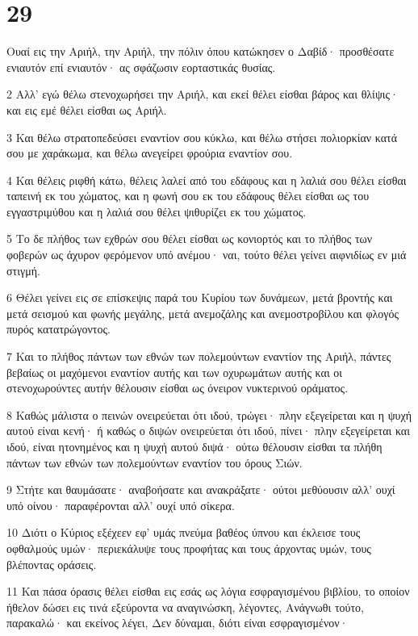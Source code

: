 \chapter{29}

\par Ουαί εις την Αριήλ, την Αριήλ, την πόλιν όπου κατώκησεν ο Δαβίδ· προσθέσατε ενιαυτόν επί ενιαυτόν· ας σφάζωσιν εορταστικάς θυσίας.
\par 2 Αλλ' εγώ θέλω στενοχωρήσει την Αριήλ, και εκεί θέλει είσθαι βάρος και θλίψις· και εις εμέ θέλει είσθαι ως Αριήλ.
\par 3 Και θέλω στρατοπεδεύσει εναντίον σου κύκλω, και θέλω στήσει πολιορκίαν κατά σου με χαράκωμα, και θέλω ανεγείρει φρούρια εναντίον σου.
\par 4 Και θέλεις ριφθή κάτω, θέλεις λαλεί από του εδάφους και η λαλιά σου θέλει είσθαι ταπεινή εκ του χώματος, και η φωνή σου εκ του εδάφους θέλει είσθαι ως του εγγαστριμύθου και η λαλιά σου θέλει ψιθυρίζει εκ του χώματος.
\par 5 Το δε πλήθος των εχθρών σου θέλει είσθαι ως κονιορτός και το πλήθος των φοβερών ως άχυρον φερόμενον υπό ανέμου· ναι, τούτο θέλει γείνει αιφνιδίως εν μιά στιγμή.
\par 6 Θέλει γείνει εις σε επίσκεψις παρά του Κυρίου των δυνάμεων, μετά βροντής και μετά σεισμού και φωνής μεγάλης, μετά ανεμοζάλης και ανεμοστροβίλου και φλογός πυρός κατατρώγοντος.
\par 7 Και το πλήθος πάντων των εθνών των πολεμούντων εναντίον της Αριήλ, πάντες βεβαίως οι μαχόμενοι εναντίον αυτής και των οχυρωμάτων αυτής και οι στενοχωρούντες αυτήν θέλουσιν είσθαι ως όνειρον νυκτερινού οράματος.
\par 8 Καθώς μάλιστα ο πεινών ονειρεύεται ότι ιδού, τρώγει· πλην εξεγείρεται και η ψυχή αυτού είναι κενή· ή καθώς ο διψών ονειρεύεται ότι ιδού, πίνει· πλην εξεγείρεται και ιδού, είναι ητονημένος και η ψυχή αυτού διψά· ούτω θέλουσιν είσθαι τα πλήθη πάντων των εθνών των πολεμούντων εναντίον του όρους Σιών.
\par 9 Στήτε και θαυμάσατε· αναβοήσατε και ανακράξατε· ούτοι μεθύουσιν αλλ' ουχί υπό οίνου· παραφέρονται αλλ' ουχί υπό σίκερα.
\par 10 Διότι ο Κύριος εξέχεεν εφ' υμάς πνεύμα βαθέος ύπνου και έκλεισε τους οφθαλμούς υμών· περιεκάλυψε τους προφήτας και τους άρχοντας υμών, τους βλέποντας οράσεις.
\par 11 Και πάσα όρασις θέλει είσθαι εις εσάς ως λόγια εσφραγισμένου βιβλίου, το οποίον ήθελον δώσει εις τινά εξεύροντα να αναγινώσκη, λέγοντες, Ανάγνωθι τούτο, παρακαλώ· και εκείνος λέγει, Δεν δύναμαι, διότι είναι εσφραγισμένον·
